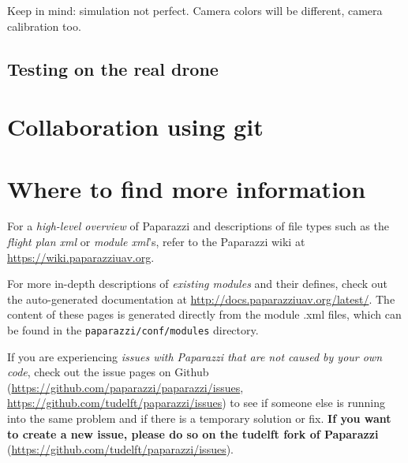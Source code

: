 \documentclass{article}
\begin{document}
Keep in mind: simulation not perfect. Camera colors will be different, camera calibration too.

\subsection{Testing on the real drone}


\section{Collaboration using git}

\section{Where to find more information}
For a \emph{high-level overview} of Paparazzi and descriptions of file types such as the \emph{flight plan xml} or \emph{module xml}'s, refer to the Paparazzi wiki at \url{https://wiki.paparazziuav.org}.

For more in-depth descriptions of \emph{existing modules} and their defines, check out the auto-generated documentation at \url{http://docs.paparazziuav.org/latest/}. The content of these pages is generated directly from the module .xml files, which can be found in the \texttt{paparazzi/conf/modules} directory.

If you are experiencing \emph{issues with Paparazzi that are not caused by your own code}, check out the issue pages on Github (\url{https://github.com/paparazzi/paparazzi/issues}, \url{https://github.com/tudelft/paparazzi/issues}) to see if someone else is running into the same problem and if there is a temporary solution or fix.
\textbf{If you want to create a new issue, please do so on the tudelft fork of Paparazzi} (\url{https://github.com/tudelft/paparazzi/issues}).
\end{document}
